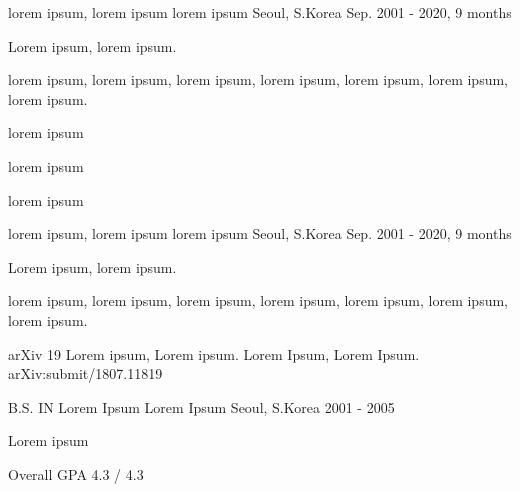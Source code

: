 \documentclass{style}
\begin{document}
\cventry
{lorem ipsum, lorem ipsum}
{lorem ipsum}
{Seoul, S.Korea}
{Sep. 2001 - 2020, 9 months}
{
\begin{cvitems}
    \item Lorem ipsum, lorem ipsum.
    \item lorem ipsum, lorem ipsum, lorem ipsum, lorem ipsum, lorem ipsum, lorem ipsum, lorem ipsum.
    \item lorem ipsum
    \item lorem ipsum
    \item lorem ipsum
\end{cvitems}
}

\cventry
{lorem ipsum, lorem ipsum}
{lorem ipsum}
{Seoul, S.Korea}
{Sep. 2001 - 2020, 9 months}
{
\begin{cvitems}
    \item Lorem ipsum, lorem ipsum.
    \item lorem ipsum, lorem ipsum, lorem ipsum, lorem ipsum, lorem ipsum, lorem ipsum, lorem ipsum.
\end{cvitems}
}

\publication
{arXiv}
{19}
{Lorem ipsum, Lorem ipsum.}
{Lorem Ipsum, Lorem Ipsum.}
{arXiv:submit/1807.11819}

\cventry
{B.S. IN Lorem Ipsum}
{Lorem Ipsum}
{Seoul, S.Korea}
{2001 - 2005}
{
\begin{cvitems}
    \item Lorem ipsum
    \item {Overall GPA 4.3 / 4.3}
\end{cvitems}
}
\end{document}
